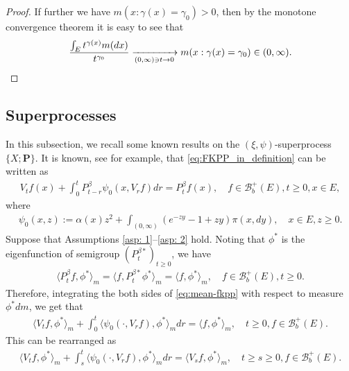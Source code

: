 \documentclass[12pt,a4paper]{amsart}
\theoremstyle{definition}
\numberwithin{equation}{section}
\begin{document}
\begin{proof}
	If further 
	we have $m(x:\gamma(x) = \gamma_0)>0$, then by the monotone convergence theorem  it is easy to see that
  \begin{equation}
    \frac{\int_E t^{\gamma(x)} m(dx)}{t^{\gamma_0}}
    \xrightarrow[(0,\infty)\ni t\to 0]{} m(x:\gamma(x) = \gamma_0)\in (0,\infty).
    \qedhere
  \end{equation}
\end{proof}

\subsection{Superprocesses} \label{sec: Superprocesses}
In this subsection, we recall some known results on the $(\xi, \psi)$-superprocess $\{X; \mathbf P\}$.
It is known, see \cite[Theorem 2.23]{Li2011Measure-valued} for example, that \eqref{eq:FKPP_in_definition} can be written as
\begin{align}\label{eq:mean-fkpp}
	V_t f(x) + \int_0^t P^\beta_{t-r} \psi_0(x,V_r f) dr
	= P^\beta_t f(x),
	\quad f \in \mathscr B^+_b(E), t \geq 0,x \in E,
\end{align}
where
\begin{align}
	\psi_0(x,z)
	:= \alpha(x) z^2 + \int_{(0,\infty)} (e^{-z y} - 1 + z y) \pi(x,dy),
	\quad x \in E,z \geq 0.
\end{align}
Suppose that Assumptions \ref{asp: 1}--\ref{asp: 2} hold.
Noting that $\phi^*$ is the eigenfunction of semigroup $(P_t^{\beta*})_{t\geq 0}$, we have
\begin{align}
  \langle P^\beta_{t} f, \phi^* \rangle_m 
  = \langle f, P^{\beta*}_{t}\phi^* \rangle_m 
  = \langle f, \phi^* \rangle_m,
  \quad f\in \mathscr B^+_b(E), t\geq 0. 
\end{align}
Therefore, integrating the both sides of \eqref{eq:mean-fkpp} with respect to measure $\phi^*dm$, we get that
\begin{align}
  \langle V_tf,\phi^*\rangle_m + \int_0^t \langle \psi_0(\cdot ,V_r f) , \phi^*\rangle_mdr
  = \langle f,\phi^*\rangle_m,
  \quad t\geq 0, f\in \mathscr B^+_b(E).
\end{align}
This can be rearranged as
\begin{align}\label{eq:langleVtfphiranglem_equation}
  \langle V_tf,\phi^*\rangle_m + \int_s^t \langle \psi_0(\cdot ,V_r f) , \phi^*\rangle_mdr
  = \langle V_sf,\phi^*\rangle_m,
  \quad t\geq s\geq 0, f\in \mathscr B^+_b(E).
\end{align}    
\end{document}
